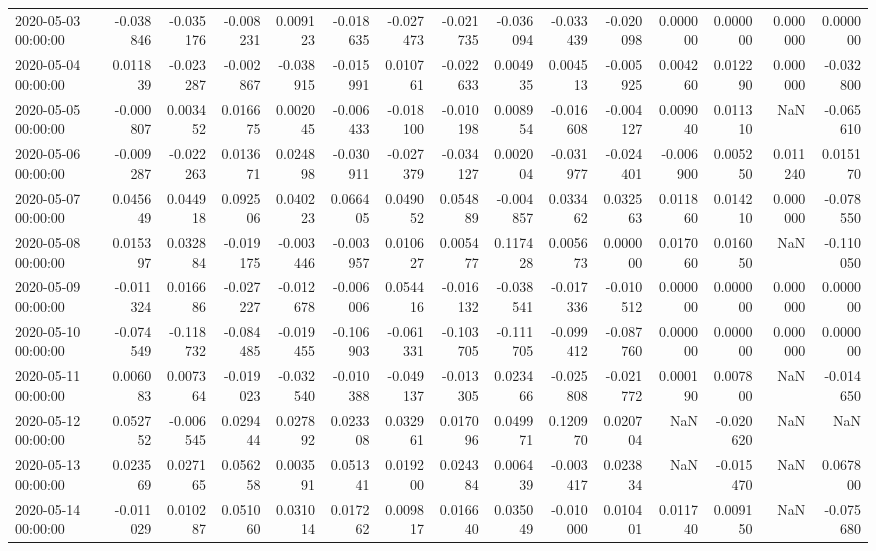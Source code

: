 \begin{tabular}{lrrrrrrrrrrrrrr}
2020-05-03 00:00:00 & -0.038846 & -0.035176 & -0.008231 & 0.009123 & -0.018635 & -0.027473 & -0.021735 & -0.036094 & -0.033439 & -0.020098 & 0.000000 & 0.000000 & 0.000000 & 0.000000 \\
2020-05-04 00:00:00 & 0.011839 & -0.023287 & -0.002867 & -0.038915 & -0.015991 & 0.010761 & -0.022633 & 0.004935 & 0.004513 & -0.005925 & 0.004260 & 0.012290 & 0.000000 & -0.032800 \\
2020-05-05 00:00:00 & -0.000807 & 0.003452 & 0.016675 & 0.002045 & -0.006433 & -0.018100 & -0.010198 & 0.008954 & -0.016608 & -0.004127 & 0.009040 & 0.011310 & NaN & -0.065610 \\
2020-05-06 00:00:00 & -0.009287 & -0.022263 & 0.013671 & 0.024898 & -0.030911 & -0.027379 & -0.034127 & 0.002004 & -0.031977 & -0.024401 & -0.006900 & 0.005250 & 0.011240 & 0.015170 \\
2020-05-07 00:00:00 & 0.045649 & 0.044918 & 0.092506 & 0.040223 & 0.066405 & 0.049052 & 0.054889 & -0.004857 & 0.033462 & 0.032563 & 0.011860 & 0.014210 & 0.000000 & -0.078550 \\
2020-05-08 00:00:00 & 0.015397 & 0.032884 & -0.019175 & -0.003446 & -0.003957 & 0.010627 & 0.005477 & 0.117428 & 0.005673 & 0.000000 & 0.017060 & 0.016050 & NaN & -0.110050 \\
2020-05-09 00:00:00 & -0.011324 & 0.016686 & -0.027227 & -0.012678 & -0.006006 & 0.054416 & -0.016132 & -0.038541 & -0.017336 & -0.010512 & 0.000000 & 0.000000 & 0.000000 & 0.000000 \\
2020-05-10 00:00:00 & -0.074549 & -0.118732 & -0.084485 & -0.019455 & -0.106903 & -0.061331 & -0.103705 & -0.111705 & -0.099412 & -0.087760 & 0.000000 & 0.000000 & 0.000000 & 0.000000 \\
2020-05-11 00:00:00 & 0.006083 & 0.007364 & -0.019023 & -0.032540 & -0.010388 & -0.049137 & -0.013305 & 0.023466 & -0.025808 & -0.021772 & 0.000190 & 0.007800 & NaN & -0.014650 \\
2020-05-12 00:00:00 & 0.052752 & -0.006545 & 0.029444 & 0.027892 & 0.023308 & 0.032961 & 0.017096 & 0.049971 & 0.120970 & 0.020704 & NaN & -0.020620 & NaN & NaN \\
2020-05-13 00:00:00 & 0.023569 & 0.027165 & 0.056258 & 0.003591 & 0.051341 & 0.019200 & 0.024384 & 0.006439 & -0.003417 & 0.023834 & NaN & -0.015470 & NaN & 0.067800 \\
2020-05-14 00:00:00 & -0.011029 & 0.010287 & 0.051060 & 0.031014 & 0.017262 & 0.009817 & 0.016640 & 0.035049 & -0.010000 & 0.010401 & 0.011740 & 0.009150 & NaN & -0.075680 \\

\end{tabular}
